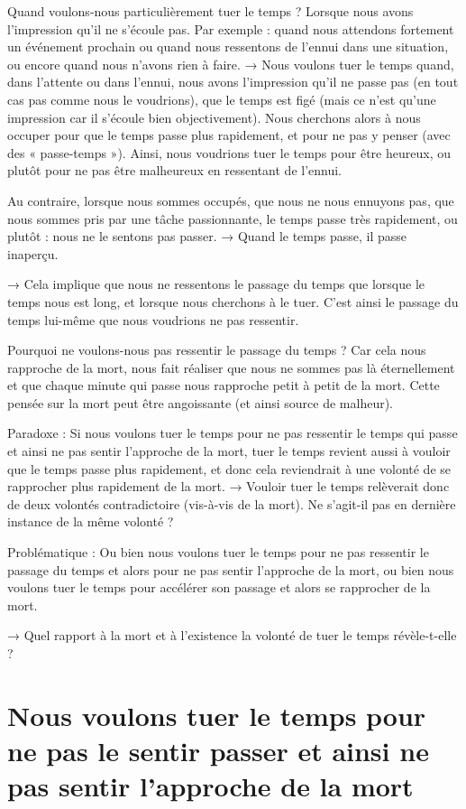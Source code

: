\documentclass[french]{book}
\theoremstyle{definition}
\begin{document}
Quand voulons-nous particulièrement tuer le temps ? Lorsque nous avons l’impression qu’il ne s’écoule pas. Par exemple : quand nous attendons fortement un événement prochain ou quand nous ressentons de l’ennui dans une situation, ou encore quand nous n’avons rien à faire. → Nous voulons tuer le temps quand, dans l’attente ou dans l’ennui, nous avons l’impression qu’il ne passe pas (en tout cas pas comme nous le voudrions), que le temps est figé (mais ce n’est qu’une impression car il s’écoule bien objectivement). Nous cherchons alors à nous occuper pour que le temps passe plus rapidement, et pour ne pas y penser (avec des « passe-temps »). Ainsi, nous voudrions tuer le temps pour être heureux, ou plutôt pour ne pas être malheureux en ressentant de l’ennui.

Au contraire, lorsque nous sommes occupés, que nous ne nous ennuyons pas, que nous sommes pris par une tâche passionnante, le temps passe très rapidement, ou plutôt : nous ne le sentons pas passer. → Quand le temps passe, il passe inaperçu.

→ Cela implique que nous ne ressentons le passage du temps que lorsque le temps nous est long, et lorsque nous cherchons à le tuer. C’est ainsi le passage du temps lui-même que nous voudrions ne pas ressentir.

Pourquoi ne voulons-nous pas ressentir le passage du temps ? Car cela nous rapproche de la mort, nous fait réaliser que nous ne sommes pas là éternellement et que chaque minute qui passe nous rapproche petit à petit de la mort. Cette pensée sur la mort peut être angoissante (et ainsi source de malheur).

Paradoxe : Si nous voulons tuer le temps pour ne pas ressentir le temps qui passe et ainsi ne pas sentir l’approche de la mort, tuer le temps revient aussi à vouloir que le temps passe plus rapidement, et donc cela reviendrait à une volonté de se rapprocher plus rapidement de la mort. → Vouloir tuer le temps relèverait donc de deux volontés contradictoire (vis-à-vis de la mort). Ne s’agit-il pas en dernière instance de la même volonté ?

Problématique : Ou bien nous voulons tuer le temps pour ne pas ressentir le passage du temps et alors pour ne pas sentir l’approche de la mort, ou bien nous voulons tuer le temps pour accélérer son passage et alors se rapprocher de la mort.

→ Quel rapport à la mort et à l’existence la volonté de tuer le temps révèle-t-elle ?

\section{Nous voulons tuer le temps pour ne pas le sentir passer et ainsi ne pas sentir l’approche de la mort}
\end{document}
